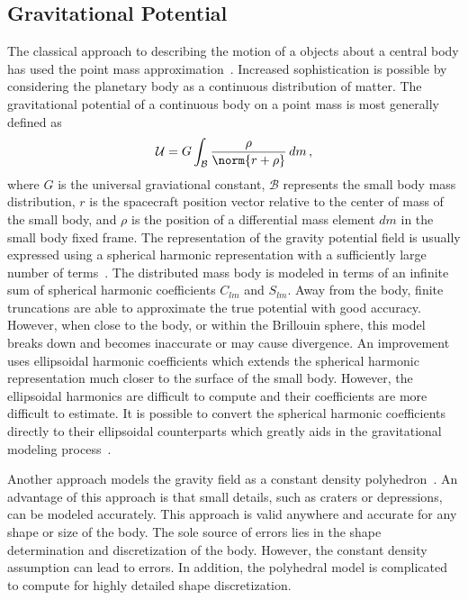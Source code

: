 \documentclass[11pt,draft]{article} %
\begin{document}
\subsection{Gravitational Potential}
The classical approach to describing the motion of a objects about a central body has used the point mass approximation~\cite{vallado2001,bate1971}.
Increased sophistication is possible by considering the planetary body as a continuous distribution of matter. 
The gravitational potential of a continuous body on a point mass is most generally defined as 
\begin{equation*}
	\mathcal{U} = G \int_\mathcal{B} \frac{\rho}{\norm{r + \rho}} \, dm \, ,
\end{equation*}
where \( G \) is the universal graviational constant, \( \mathcal{B} \) represents the small body mass distribution, \( r \) is the spacecraft position vector relative to the center of mass of the small body, and \( \rho \) is the position of a differential mass element \( dm \) in the small body fixed frame.
The representation of the gravity potential field is usually expressed using a spherical harmonic representation with a sufficiently large number of terms~\cite{scheeres2012}.
The distributed mass body is modeled in terms of an infinite sum of spherical harmonic coefficients \( C_{lm} \) and \( S_{lm} \).
Away from the body, finite truncations are able to approximate the true potential with good accuracy.
However, when close to the body, or within the Brillouin sphere, this model breaks down and becomes inaccurate or may cause divergence. 
An improvement uses ellipsoidal harmonic coefficients which extends the spherical harmonic representation much closer to the surface of the small body.
However, the ellipsoidal harmonics are difficult to compute and their coefficients are more difficult to estimate.
It is possible to convert the spherical harmonic coefficients directly to their ellipsoidal counterparts which greatly aids in the gravitational modeling process~\cite{dechambre2002}.

Another approach models the gravity field as a constant density polyhedron~\cite{werner1996}.
An advantage of this approach is that small details, such as craters or depressions, can be modeled accurately.
This approach is valid anywhere and accurate for any shape or size of the body. 
The sole source of errors lies in the shape determination and discretization of the body.
However, the constant density assumption can lead to errors. 
In addition, the polyhedral model is complicated to compute for highly detailed shape discretization.
\end{document}
